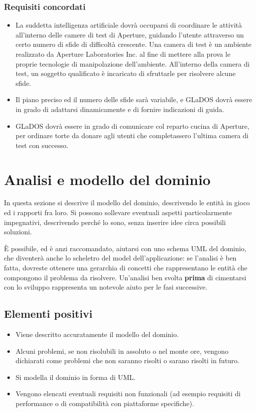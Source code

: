 \documentclass[a4paper,12pt]{report}
\begin{document}
\subsubsection{Requisiti concordati}
\begin{itemize}
	\item La suddetta intelligenza artificiale dovrà occuparsi di coordinare le attività all'interno delle camere di test di Aperture, guidando l'utente attraverso un certo numero di sfide di difficoltà crescente. Una camera di test è un ambiente realizzato da Aperture Laboratories Inc. al fine di mettere alla prova le proprie tecnologie di manipolazione dell'ambiente. All'interno della camera di test, un soggetto qualificato è incaricato di sfruttarle per risolvere alcune sfide.
	\item Il piano preciso ed il numero delle sfide sarà variabile, e GLaDOS dovrà essere in grado di adattarsi dinamicamente e di fornire indicazioni di guida.
	\item GLaDOS dovrà essere in grado di comunicare col reparto cucina di Aperture, per ordinare torte da donare agli utenti che completassero l'ultima camera di test con successo.
\end{itemize}

\section{Analisi e modello del dominio}

In questa sezione si descrive il modello del dominio, descrivendo le entità in gioco ed i rapporti fra loro.
%
Si possono sollevare eventuali aspetti particolarmente impegnativi, descrivendo perché lo sono, senza inserire idee circa possibili soluzioni.

È possibile, ed è anzi raccomandato, aiutarsi con uno schema UML del dominio, che diventerà anche lo scheletro del model dell'applicazione: se l'analisi è ben fatta, dovreste ottenere una gerarchia di concetti che rappresentano le entità che compongono il problema da risolvere.
%
Un'analisi ben svolta \textbf{prima} di cimentarsi con lo sviluppo rappresenta un notevole aiuto per le fasi successive.

\subsection*{Elementi positivi}
\begin{itemize}
	\item Viene descritto accuratamente il modello del dominio.
	\item Alcuni problemi, se non risolubili in assoluto o nel monte ore, vengono dichiarati come problemi che non saranno risolti o sarano risolti in futuro.
	\item Si modella il dominio in forma di UML.
	\item Vengono elencati eventuali requisiti non funzionali (ad esempio requisiti di performance o di compatibilità con piattaforme specifiche).
\end{itemize}
\end{document}
